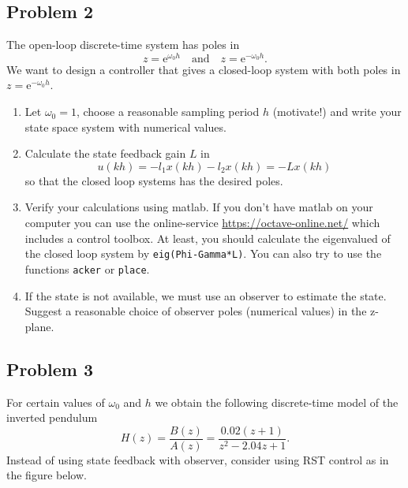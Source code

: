 \documentclass[letterpaper,12pt]{article}
\newcommand*{\mexp}[1]{\ensuremath{\mathrm{e}^{#1}}}
\begin{document}
\subsection*{Problem 2}

The open-loop discrete-time system has poles in 
\[ z = \mexp{\omega_0h} \quad \text{and} \quad z = \mexp{-\omega_0h}.\]
We want to design a controller that gives a closed-loop system with both poles in $z = \mexp{-\omega_0h}$. 

\begin{enumerate}
\item Let $\omega_0=1$, choose a reasonable sampling period $h$ (motivate!) and write your state space system with numerical values. 
\item Calculate the state feedback gain $L$ in 
\[ u(kh) = -l_1 x(kh) - l_2 x(kh) = -L x(kh)\]
so that the closed loop systems has the desired poles. 
\item Verify your calculations using matlab. If you don't have matlab on your computer you can use the online-service \url{https://octave-online.net/} which includes a control toolbox. At least, you should calculate the eigenvalued of the closed loop system by \verb!eig(Phi-Gamma*L)!. You can also try to use the functions \verb!acker! or \verb!place!.  
\item If the state is not available, we must use an observer to estimate the state. Suggest a reasonable choice of observer poles (numerical values) in the z-plane.  
\end{enumerate}

\subsection*{Problem 3}
For certain values of $\omega_0$ and $h$ we obtain the following discrete-time model of the inverted pendulum
\[ H(z) = \frac{B(z)}{A(z)} = \frac{0.02(z+1)}{z^2 - 2.04z + 1}. \]
Instead of using state feedback with observer, consider using RST control as in the figure below.
\end{document}
